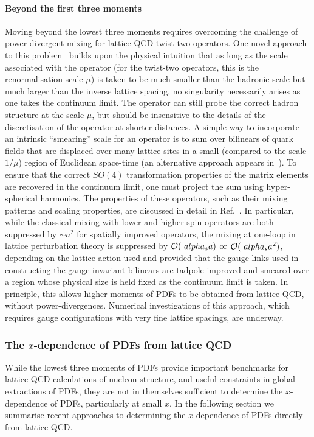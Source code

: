 \paragraph*{Beyond the first three moments} Moving beyond the lowest three moments requires overcoming the challenge of power-divergent mixing for lattice-QCD twist-two operators. One novel approach to this problem~\cite{Davoudi:2012ya} builds upon the physical intuition that as long as the scale associated with the operator (for the twist-two operators, this is the renormalisation scale $\mu$) is taken to be much smaller than the hadronic scale but much larger than the inverse lattice spacing, no singularity necessarily arises as one takes the continuum limit. The operator can still probe the correct hadron structure at the scale $\mu$, but should be insensitive to the details of the discretisation of the operator at shorter distances. A simple way to incorporate an intrinsic ``smearing” scale for an operator is to sum over bilinears of quark fields that are displaced over many lattice sites in a small (compared to the scale $1/\mu$) region of Euclidean space-time (an alternative approach appears in~\cite{Monahan:2015lha}). To ensure that the correct $SO(4)$ transformation properties of the matrix elements are recovered in the continuum limit, one must project the sum using hyper-spherical harmonics. The properties of these operators, such as their mixing patterns and scaling properties, are discussed in detail in
Ref.~\cite{Davoudi:2012ya}. In particular, while the classical mixing with lower and higher spin operators are both suppressed by $\sim a^2$ for spatially improved operators, the mixing at one-loop in lattice perturbation theory is suppressed by ${\cal O}(\ alpha_s a)$ or ${\cal O}(\ alpha_s a^2)$, depending on the lattice action used and provided that the gauge links used in constructing the gauge invariant bilinears are tadpole-improved and smeared over a region whose physical size is held fixed as the continuum limit is taken. In principle, this allows higher moments of PDFs to be obtained from lattice QCD, without power-divergences. Numerical investigations of this approach,
which requires gauge configurations with very fine lattice spacings, are underway.

\subsubsection{The $x$-dependence of PDFs from lattice QCD}

While the lowest three moments of PDFs provide important benchmarks for lattice-QCD calculations of nucleon structure, and useful constraints in global extractions of PDFs, they are not in themselves sufficient to determine the $x$-dependence of PDFs, particularly at small $x$. In the following section we summarise recent approaches to determining the $x$-dependence of PDFs directly from lattice QCD.

